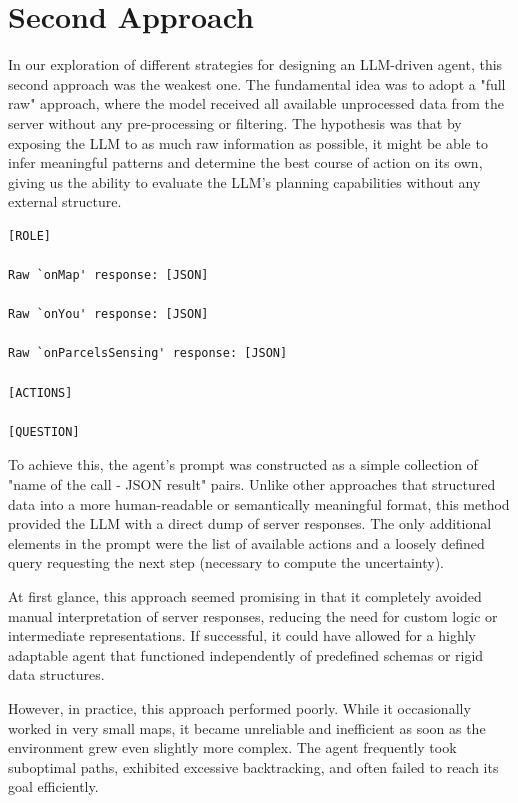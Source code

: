 \section{Second Approach}
\label{sec:second_approach}

In our exploration of different strategies for designing an LLM-driven agent,
this second approach was the weakest one. The fundamental idea was to adopt a "full
raw" approach, where the model received all available unprocessed data from the
server without any pre-processing or filtering. The hypothesis was that by exposing
the LLM to as much raw information as possible, it might be able to infer
meaningful patterns and determine the best course of action on its own, giving us
the ability to evaluate the LLM's planning capabilities without any external structure.
\vspace{1mm}
\begin{codewindow}
  [Text]  \begin{lstlisting}
[ROLE]

Raw `onMap' response: [JSON]

Raw `onYou' response: [JSON]

Raw `onParcelsSensing' response: [JSON]

[ACTIONS]

[QUESTION]
\end{lstlisting}
\end{codewindow}
\vspace{1mm}

To achieve this, the agent's prompt was constructed as a simple collection of "name
of the call - JSON result" pairs. Unlike other approaches that structured data into
a more human-readable or semantically meaningful format, this method provided
the LLM with a direct dump of server responses. The only additional elements in the
prompt were the list of available actions and a loosely defined query requesting
the next step (necessary to compute the uncertainty).

At first glance, this approach seemed promising in that it completely avoided
manual interpretation of server responses, reducing the need for custom logic or
intermediate representations. If successful, it could have allowed for a highly adaptable
agent that functioned independently of predefined schemas or rigid data structures.

However, in practice, this approach performed poorly. While it occasionally
worked in very small maps, it became unreliable and inefficient as soon as the environment
grew even slightly more complex. The agent frequently took suboptimal paths, exhibited
excessive backtracking, and often failed to reach its goal efficiently.

